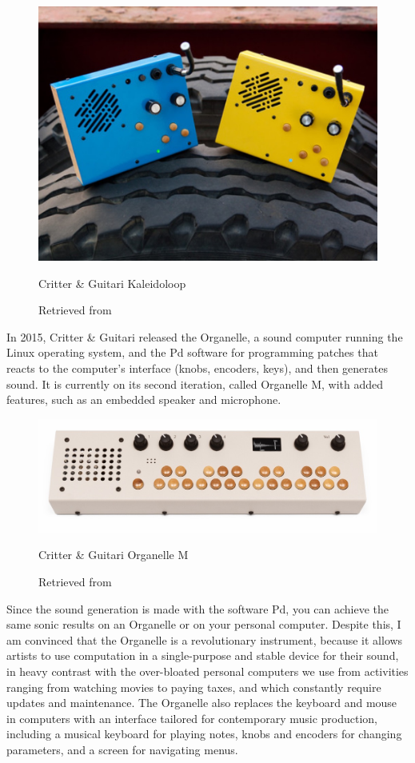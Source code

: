 \begin{figure}[ht]
  \centering
  \includegraphics[width=0.75\linewidth,height=0.25\textheight,keepaspectratio]{images/critter-and-guitari-kaleidoloop.jpg}
  \caption{Critter \& Guitari Kaleidoloop}
  \caption*{Retrieved from \cite{website-critter-and-guitari-kaleidoloop}}
  \label{fig:critter-and-guitari-kaleidoloop}
\end{figure}

In 2015, Critter \& Guitari released the Organelle, a sound computer running the Linux operating system, and the \acrfull{Pd} software for programming patches that reacts to the computer's interface (knobs, encoders, keys), and then generates sound. It is currently on its second iteration, called Organelle M, with added features, such as an embedded speaker and microphone.

\begin{figure}[ht]
  \centering
  \includegraphics[width=0.75\linewidth,height=0.25\textheight,keepaspectratio]{images/critter-and-guitari-organelle-m.jpg}
  \caption{Critter \& Guitari Organelle M}
  \caption*{Retrieved from \cite{website-critter-and-guitari-current}}
  \label{fig:critter-and-guitari-organelle-m}
\end{figure}

Since the sound generation is made with the software \acrshort{Pd}, you can achieve the same sonic results on an Organelle or on your personal computer. Despite this, I am convinced that the Organelle is a revolutionary instrument,  because it allows artists to use computation in a single-purpose and stable device for their sound, in heavy contrast with the over-bloated personal computers we use from activities ranging from watching movies to paying taxes, and which constantly require updates and maintenance. The Organelle also replaces the keyboard and mouse in computers with an interface tailored for contemporary music production, including a musical keyboard for playing notes, knobs and encoders for changing parameters, and a screen for navigating menus.

